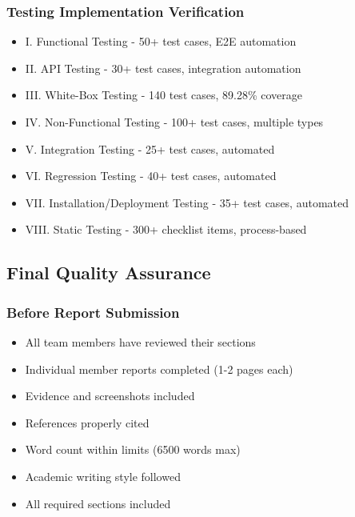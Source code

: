 \documentclass[12pt,a4paper]{article}
\begin{document}
\subsubsection{Testing Implementation Verification}
\begin{itemize}[leftmargin=*]
    \item[$\checkmark$] I. Functional Testing - 50+ test cases, E2E automation
    \item[$\checkmark$] II. API Testing - 30+ test cases, integration automation
    \item[$\checkmark$] III. White-Box Testing - 140 test cases, 89.28\% coverage
    \item[$\checkmark$] IV. Non-Functional Testing - 100+ test cases, multiple types
    \item[$\checkmark$] V. Integration Testing - 25+ test cases, automated
    \item[$\checkmark$] VI. Regression Testing - 40+ test cases, automated
    \item[$\checkmark$] VII. Installation/Deployment Testing - 35+ test cases, automated
    \item[$\checkmark$] VIII. Static Testing - 300+ checklist items, process-based
\end{itemize}

\subsection{Final Quality Assurance}

\subsubsection{Before Report Submission}
\begin{itemize}[leftmargin=*]
    \item[$\square$] All team members have reviewed their sections
    \item[$\square$] Individual member reports completed (1-2 pages each)
    \item[$\square$] Evidence and screenshots included
    \item[$\square$] References properly cited
    \item[$\square$] Word count within limits (6500 words max)
    \item[$\square$] Academic writing style followed
    \item[$\square$] All required sections included
\end{itemize}
\end{document}
